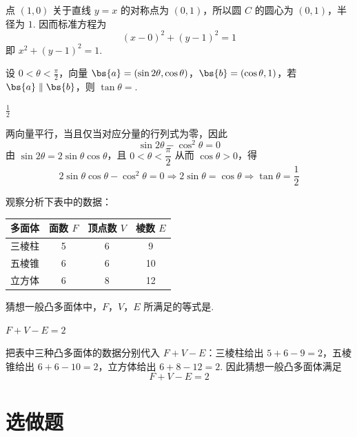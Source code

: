 \begin{solution}
点 \((1,0)\) 关于直线 \(y=x\) 的对称点为 \((0,1)\)，所以圆 \(C\) 的圆心为 \((0,1)\)，半径为 \(1\). 因而标准方程为
\[
(x-0)^2+(y-1)^2=1
\]
即 \(x^2+(y-1)^2=1\).
\end{solution}

\begin{problem}
设 \(0 < \theta < \frac{\pi}{2}\)，向量 \(\bs{a} = (\sin 2\theta, \cos \theta)\)，\(\bs{b} = (\cos \theta, 1)\)，若 \(\bs{a} \parallel \bs{b}\)，则 \(\tan \theta =\)\fillinblank{}.
\end{problem}

\begin{answer}
\(\frac{1}{2}\)
\end{answer}

\begin{solution}
两向量平行，当且仅当对应分量的行列式为零，因此
\[
\sin 2\theta-\cos^{2}\theta=0
\]
由 \(\sin 2\theta=2\sin\theta\cos\theta\)，且 \(0<\theta<\dfrac{\pi}{2}\) 从而 \(\cos\theta>0\)，得
\[
2\sin\theta\cos\theta-\cos^{2}\theta=0
\Longrightarrow 2\sin\theta=\cos\theta
\Longrightarrow \tan\theta=\frac12
\]
\end{solution}

\begin{problem}
观察分析下表中的数据：
\begin{center}
\small
\begin{tabular}{c|ccc}
\hline
多面体 & 面数 \(F\) & 顶点数 \(V\) & 棱数 \(E\) \\
\hline
三棱柱 & 5 & 6 & 9 \\
五棱锥 & 6 & 6 & 10 \\
立方体 & 6 & 8 & 12 \\
\hline
\end{tabular}
\end{center}

猜想一般凸多面体中，\(F\)，\(V\)，\(E\) 所满足的等式是\fillinblank{}.
\end{problem}

\begin{answer}
\(F + V - E = 2\)
\end{answer}

\begin{solution}
把表中三种凸多面体的数据分别代入 \(F+V-E\)：三棱柱给出 \(5+6-9=2\)，五棱锥给出 \(6+6-10=2\)，立方体给出 \(6+8-12=2\). 因此猜想一般凸多面体满足
\[
F+V-E=2
\]
\end{solution}

\section{选做题}

